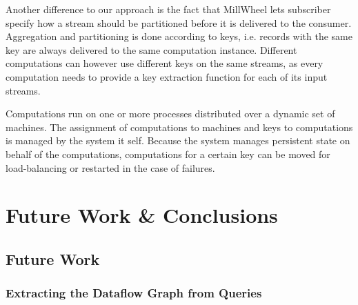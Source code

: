 Another difference to our approach is the fact that MillWheel lets subscriber
specify how a stream should be partitioned before it is delivered to the consumer.
Aggregation and partitioning is done according to keys, i.e. records with the
same key are always delivered to the same computation instance. Different
computations can however use different keys on the same streams, as every computation
needs to provide a key extraction function for each of its input streams.

Computations run on one or more processes distributed over a dynamic set of
machines. The assignment of computations to machines and keys to computations
is managed by the system it self. Because the system manages persistent state
on behalf of the computations, computations for a certain key can be moved
for load-balancing or restarted in the case of failures.

\cleardoublepage
\chapter{Future Work \& Conclusions} \label{ch:future}

\section{Future Work}



\subsection{Extracting the Dataflow Graph from Queries}

